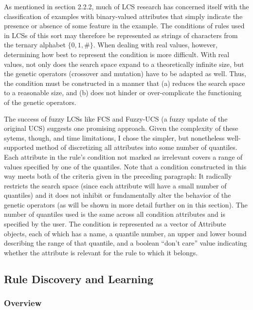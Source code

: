 \documentclass[11pt]{article}
\begin{document}
As mentioned in section 2.2.2, much of LCS research has concerned itself with the classification of examples with binary-valued attributes that simply indicate the presence or absence of some feature in the example. The conditions of rules used in LCSs of this sort may therefore be represented as strings of characters from the ternary alphabet $\{0,1,\#\}$. When dealing with real values, however, determining how best to represent the condition is more difficult. With real values, not only does the search space expand to a theoretically infinite size, but the genetic operators (crossover and mutation) have to be adapted as well. Thus, the condition must be constructed in a manner that (a) reduces the search space to a reasonable size, and (b) does not hinder or over-complicate the functioning of the genetic operators.

The success of fuzzy LCSs like FCS \cite{manuel_valenzuela-rendon_fuzzy_1991} and Fuzzy-UCS \cite{orriols-puig_fuzzy-ucs:_2009} (a fuzzy update of the original UCS) suggests one promising approach. Given the complexity of these sytems, though, and time limitations, I chose the simpler, but nonetheless well-supported method of discretizing all attributes into some number of quantiles. Each attribute in the rule's condition not marked as irrelevant covers a range of values specified by one of the quantiles. Note that a condition constructed in this way meets both of the criteria given in the preceding paragraph: It radically restricts the search space (since each attribute will have a small number of quantiles) and it does not inhibit or fundamentally alter the behavior of the genetic operators (as will be shown in more detail further on in this section). The number of quantiles used is the same across all condition attributes and is specified by the user. The condition is represented as a vector of Attribute objects, each of which has a name, a quantile number, an upper and lower bound describing the range of that quantile, and a boolean ``don’t care'' value indicating whether the attribute is relevant for the rule to which it belongs.

\subsection{Rule Discovery and Learning}

\subsubsection{Overview}
\end{document}
